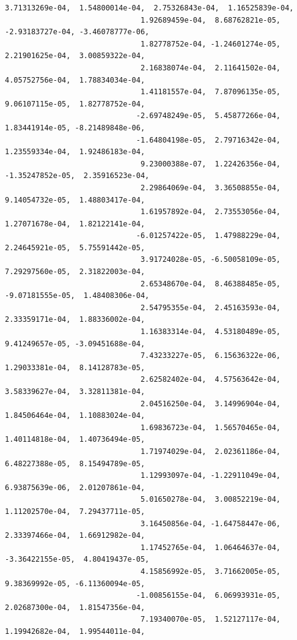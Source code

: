 \documentclass[11pt]{article}
\begin{document}
\begin{Verbatim}[commandchars=\\\{\}]
                               3.71313269e-04,  1.54800014e-04,  2.75326843e-04,  1.16525839e-04,
                               1.92689459e-04,  8.68762821e-05, -2.93183727e-04, -3.46078777e-06,
                               1.82778752e-04, -1.24601274e-05,  2.21901625e-04,  3.00859322e-04,
                               2.16838074e-04,  2.11641502e-04,  4.05752756e-04,  1.78834034e-04,
                               1.41181557e-04,  7.87096135e-05,  9.06107115e-05,  1.82778752e-04,
                              -2.69748249e-05,  5.45877266e-04,  1.83441914e-05, -8.21489848e-06,
                              -1.64804198e-05,  2.79716342e-04,  1.23559334e-04,  1.92486183e-04,
                               9.23000388e-07,  1.22426356e-04, -1.35247852e-05,  2.35916523e-04,
                               2.29864069e-04,  3.36508855e-04,  9.14054732e-05,  1.48803417e-04,
                               1.61957892e-04,  2.73553056e-04,  1.27071678e-04,  1.82122141e-04,
                              -6.01257422e-05,  1.47988229e-04,  2.24645921e-05,  5.75591442e-05,
                               3.91724028e-05, -6.50058109e-05,  7.29297560e-05,  2.31822003e-04,
                               2.65348670e-04,  8.46388485e-05, -9.07181555e-05,  1.48408306e-04,
                               2.54795355e-04,  2.45163593e-04,  2.33359171e-04,  1.88336002e-04,
                               1.16383314e-04,  4.53180489e-05,  9.41249657e-05, -3.09451688e-04,
                               7.43233227e-05,  6.15636322e-06,  1.29033381e-04,  8.14128783e-05,
                               2.62582402e-04,  4.57563642e-04,  3.58339627e-04,  3.32811381e-04,
                               2.04516250e-04,  3.14996904e-04,  1.84506464e-04,  1.10883024e-04,
                               1.69836723e-04,  1.56570465e-04,  1.40114818e-04,  1.40736494e-05,
                               1.71974029e-04,  2.02361186e-04,  6.48227388e-05,  8.15494789e-05,
                               1.12993097e-04, -1.22911049e-04,  6.93875639e-06,  2.01207861e-04,
                               5.01650278e-04,  3.00852219e-04,  1.11202570e-04,  7.29437711e-05,
                               3.16450856e-04, -1.64758447e-06,  2.33397466e-04,  1.66912982e-04,
                               1.17452765e-04,  1.06464637e-04, -3.36422155e-05,  4.80419437e-05,
                               4.15856992e-05,  3.71662005e-05,  9.38369992e-05, -6.11360094e-05,
                              -1.00856155e-04,  6.06993931e-05,  2.02687300e-04,  1.81547356e-04,
                               7.19340070e-05,  1.52127117e-04,  1.19942682e-04,  1.99544011e-04,

\end{Verbatim}
\end{document}
